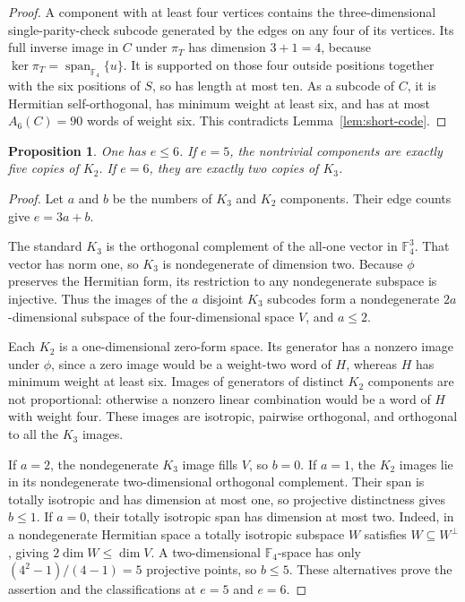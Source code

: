 \documentclass[11pt]{article}
\newtheorem{proposition}[theorem]{Proposition}
\theoremstyle{remark}
\newcommand{\F}{\mathbb F_4}
\newcommand{\Span}{\operatorname{span}_{\F}}
\begin{document}
\begin{proof}
A component with at least four vertices contains the three-dimensional
single-parity-check subcode generated by the edges on any four of its
vertices.  Its full inverse image in $C$ under $\pi_T$ has dimension
$3+1=4$, because $\ker\pi_T=\Span\{u\}$.  It is supported on those
four outside positions together with the six positions of $S$, so has
length at most ten.  As a subcode of $C$, it is Hermitian
self-orthogonal, has minimum weight at least six, and has at most
$A_6(C)=90$ words of weight six.  This contradicts
Lemma~\ref{lem:short-code}.
\end{proof}

\begin{proposition}\label{prop:six}
One has $e\leq6$.  If $e=5$, the nontrivial components are exactly
five copies of $K_2$.  If $e=6$, they are exactly two copies of $K_3$.
\end{proposition}

\begin{proof}
Let $a$ and $b$ be the numbers of $K_3$ and $K_2$ components.  Their
edge counts give $e=3a+b$.

The standard $K_3$ is the orthogonal complement of the all-one vector
in $\F^3$.  That vector has norm one, so $K_3$ is nondegenerate of
dimension two.  Because $\phi$ preserves the Hermitian form, its
restriction to any nondegenerate subspace is injective.  Thus the
images of the $a$ disjoint $K_3$ subcodes form a nondegenerate
$2a$-dimensional subspace of the four-dimensional space $V$, and
$a\leq2$.

Each $K_2$ is a one-dimensional zero-form space.  Its generator has a
nonzero image under $\phi$, since a zero image would be a weight-two
word of $H$, whereas $H$ has minimum weight at least six.  Images of
generators of distinct $K_2$ components are not proportional: otherwise
a nonzero linear combination would be a word of $H$ with weight four.
These images are isotropic, pairwise orthogonal, and orthogonal to all
the $K_3$ images.

If $a=2$, the nondegenerate $K_3$ image fills $V$, so $b=0$.
If $a=1$, the $K_2$ images lie in its nondegenerate
two-dimensional orthogonal complement.  Their span is totally
isotropic and has dimension at most one, so projective distinctness
gives $b\leq1$.
If $a=0$, their totally isotropic span has dimension at most two.
Indeed, in a nondegenerate Hermitian space a totally isotropic
subspace $W$ satisfies $W\subseteq W^\perp$, giving
$2\dim W\leq\dim V$.  A two-dimensional $\F$-space has only
$(4^2-1)/(4-1)=5$ projective points, so $b\leq5$.
These alternatives prove the assertion and the classifications at
$e=5$ and $e=6$.
\end{proof}
\end{document}
